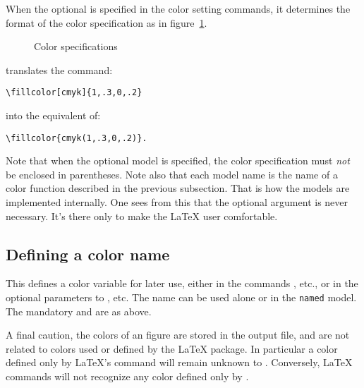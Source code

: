 \documentclass[letterpaper]{article}
\begin{document}
When the optional  is specified in the color setting
commands, it determines the format of the color specification as in
figure~\ref{fig:colorspecs}.

\begin{figure}[hbt]
\caption{Color specifications}
\label{fig:colorspecs}
\end{figure}

\pagebreak[3]
\Mfp{} translates the command:
\begin{verbatim}
\fillcolor[cmyk]{1,.3,0,.2}
\end{verbatim}
into the equivalent of:
\begin{verbatim}
\fillcolor{cmyk(1,.3,0,.2)}.
\end{verbatim}
Note that when the optional model is specified, the color specification
must \emph{not} be enclosed in parentheses. Note also that each model
name is the name of a color function described in the previous
subsection. That is how the models are implemented internally. One sees
from this that the optional argument is never necessary. It's there only
to make the \LaTeX{} user comfortable.


\subsection{Defining a color name}\label{colorname}

\begin{cd}
%
\end{cd}

This defines a color variable  for later use, either in the
commands , etc., or in the optional parameters to
, etc. The name can be used alone or in the \texttt{named} model.
The mandatory  and  are as above.

\medskip
A final caution, the colors of an \mfp{} figure are stored in the
 output file, and are not related to colors used or defined by
the \LaTeX{}  package. In particular a color defined only by
\LaTeX{}'s  command will remain unknown to \mfp{}.
Conversely, \LaTeX{} commands will not recognize any color defined only
by .
\end{document}
